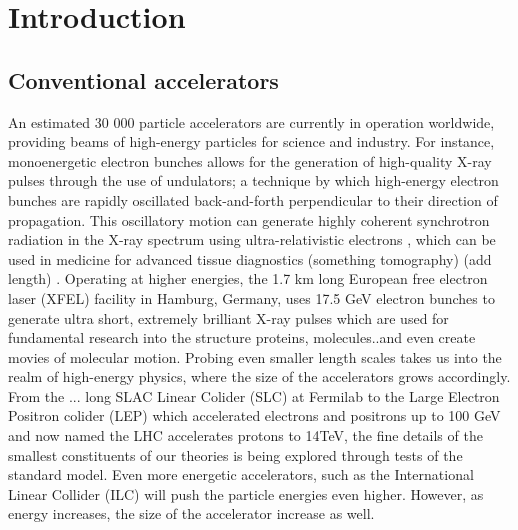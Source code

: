 \chapter{Introduction}
\section{Conventional accelerators}\vspace{-8pt}
An estimated 30 000 particle accelerators are currently in operation worldwide, 
providing beams of high-energy particles for science and industry. 
For instance, monoenergetic electron bunches allows for the generation of high-quality X-ray pulses through the use of undulators; a technique by which high-energy electron bunches are rapidly oscillated back-and-forth perpendicular to their direction of propagation. This oscillatory motion can generate highly coherent synchrotron radiation in the X-ray spectrum using  ultra-relativistic electrons , which can be used in medicine for advanced tissue diagnostics  (something tomography) (add length) . Operating at higher energies, the 1.7 km long European free electron laser (XFEL) facility in Hamburg, Germany, uses 17.5 GeV electron bunches to generate ultra short, extremely brilliant X-ray pulses which are used for fundamental research into the structure proteins, molecules..and even create movies of molecular motion. Probing even smaller length scales takes us into the realm of high-energy physics, where the size of the accelerators grows accordingly. From the ... long SLAC Linear Colider (SLC) at Fermilab to the Large Electron Positron colider (LEP) which accelerated electrons and positrons up to 100 GeV and now named the LHC accelerates protons to 14TeV, the fine details of the smallest constituents of our theories is being explored through tests of the standard model. Even more energetic accelerators, such as the International Linear Collider (ILC) will push the particle energies even higher. However, as energy increases, the size of the accelerator increase as well. \\
